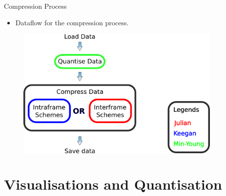\documentclass{beamer}
\begin{document}
\begin{frame}{Compression Process}
  \begin{itemize}
   \item Dataflow for the compression process.
  \end{itemize}

  \begin{figure}
    \includegraphics[width=0.9\textwidth]{legends.png}
  \end{figure}
\end{frame}


\section{Visualisations and Quantisation}
\end{document}
